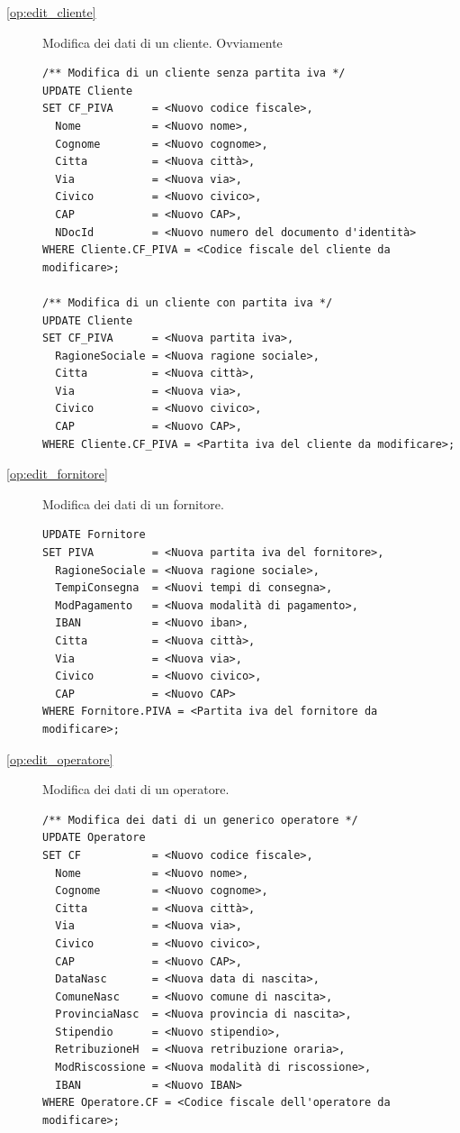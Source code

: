           \begin{description}
            
            \item[\ref{op:edit_cliente}] Modifica dei dati di un cliente. Ovviamente 
              \begin{lstlisting}
/** Modifica di un cliente senza partita iva */
UPDATE Cliente
SET CF_PIVA      = <Nuovo codice fiscale>,
  Nome           = <Nuovo nome>,
  Cognome        = <Nuovo cognome>,
  Citta          = <Nuova città>,
  Via            = <Nuova via>,
  Civico         = <Nuovo civico>,
  CAP            = <Nuovo CAP>,
  NDocId         = <Nuovo numero del documento d'identità>
WHERE Cliente.CF_PIVA = <Codice fiscale del cliente da modificare>;

/** Modifica di un cliente con partita iva */
UPDATE Cliente
SET CF_PIVA      = <Nuova partita iva>,
  RagioneSociale = <Nuova ragione sociale>,
  Citta          = <Nuova città>,
  Via            = <Nuova via>,
  Civico         = <Nuovo civico>,
  CAP            = <Nuovo CAP>,
WHERE Cliente.CF_PIVA = <Partita iva del cliente da modificare>;
              \end{lstlisting}
            
            \item[\ref{op:edit_fornitore}] Modifica dei dati di un fornitore.
              \begin{lstlisting}
UPDATE Fornitore
SET PIVA         = <Nuova partita iva del fornitore>,
  RagioneSociale = <Nuova ragione sociale>,
  TempiConsegna  = <Nuovi tempi di consegna>,
  ModPagamento   = <Nuova modalità di pagamento>,
  IBAN           = <Nuovo iban>,
  Citta          = <Nuova città>,
  Via            = <Nuova via>,
  Civico         = <Nuovo civico>,
  CAP            = <Nuovo CAP>
WHERE Fornitore.PIVA = <Partita iva del fornitore da modificare>;
              \end{lstlisting}

            \item[\ref{op:edit_operatore}] Modifica dei dati di un operatore.
              \begin{lstlisting}
/** Modifica dei dati di un generico operatore */
UPDATE Operatore
SET CF           = <Nuovo codice fiscale>,
  Nome           = <Nuovo nome>,
  Cognome        = <Nuovo cognome>,
  Citta          = <Nuova città>,
  Via            = <Nuova via>,
  Civico         = <Nuovo civico>,
  CAP            = <Nuovo CAP>,
  DataNasc       = <Nuova data di nascita>,
  ComuneNasc     = <Nuovo comune di nascita>,
  ProvinciaNasc  = <Nuova provincia di nascita>,
  Stipendio      = <Nuovo stipendio>,
  RetribuzioneH  = <Nuova retribuzione oraria>,
  ModRiscossione = <Nuova modalità di riscossione>,
  IBAN           = <Nuovo IBAN>
WHERE Operatore.CF = <Codice fiscale dell'operatore da modificare>;
              \end{lstlisting}


\end{description}
